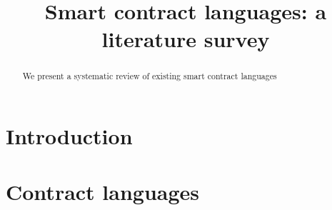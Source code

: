 \documentclass{article}
\title{Smart contract languages: a literature survey}
\begin{document}
\maketitle

\begin{abstract}
We present a systematic review of existing smart contract languages
\end{abstract}

\section{Introduction}

\section{Contract languages}
\end{document}

